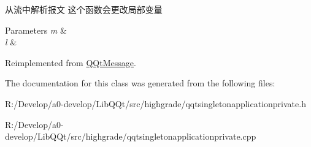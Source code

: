 从流中解析报文 这个函数会更改局部变量 


\begin{DoxyParams}{Parameters}
{\em m} & \\
\hline
{\em l} & \\
\hline
\end{DoxyParams}


Reimplemented from \mbox{\hyperlink{class_q_qt_message_a0bc25669bdd61490b1d8df6d77565f31}{Q\+Qt\+Message}}.



The documentation for this class was generated from the following files\+:\begin{DoxyCompactItemize}
\item 
R\+:/\+Develop/a0-\/develop/\+Lib\+Q\+Qt/src/highgrade/qqtsingletonapplicationprivate.\+h\item 
R\+:/\+Develop/a0-\/develop/\+Lib\+Q\+Qt/src/highgrade/qqtsingletonapplicationprivate.\+cpp\end{DoxyCompactItemize}
